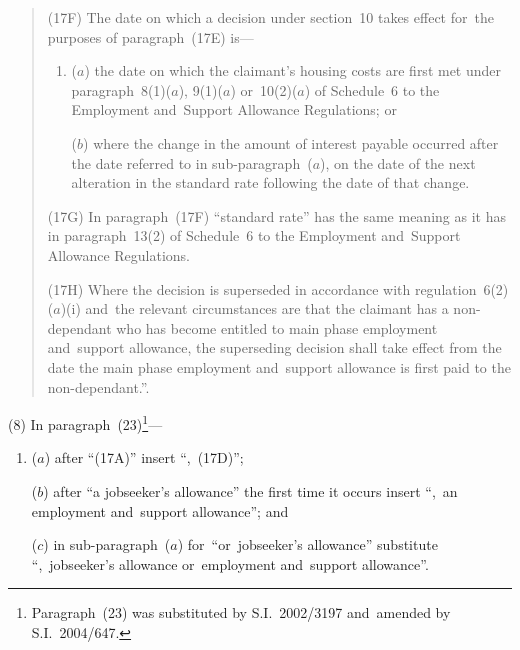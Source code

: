 \documentclass[12pt,a4paper]{article}
\begin{document}
\begin{quotation}
(17F) The date on which a decision under section~10 takes effect for~the purposes of paragraph~(17E) is—
\begin{enumerate}\item[]
($a$) the date on which the claimant’s housing costs are first met under paragraph~8(1)($a$), 9(1)($a$)  or~10(2)($a$)  of Schedule~6 to the Employment and~Support Allowance Regulations; or

($b$) where the change in the amount of interest payable occurred after the date referred to in sub-paragraph~($a$), on the date of the next alteration in the standard rate following the date of that change.
\end{enumerate}

(17G) In paragraph~(17F) “standard rate” has the same meaning as it has in paragraph~13(2) of Schedule~6 to the Employment and~Support Allowance Regulations.

(17H) Where the decision is superseded in accordance with regulation~6(2)($a$)(i)  and~the relevant circumstances are that the claimant has a non-dependant who has become entitled to main phase employment and~support allowance, the superseding decision shall take effect from the date the main phase employment and~support allowance is first paid to the non-dependant.”.
\end{quotation}

(8) In paragraph~(23)\footnote{Paragraph~(23) was substituted by S.I.~2002/3197 and~amended by S.I.~2004/647.}—
\begin{enumerate}\item[]
($a$) after “(17A)” insert “,~(17D)”;

($b$) after “a jobseeker’s allowance” the first time it occurs insert “,~an employment and~support allowance”; and

($c$) in sub-paragraph~($a$)  for~“or~jobseeker’s allowance” substitute “,~jobseeker’s allowance or~employment and~support allowance”.
\end{enumerate}
\end{document}
